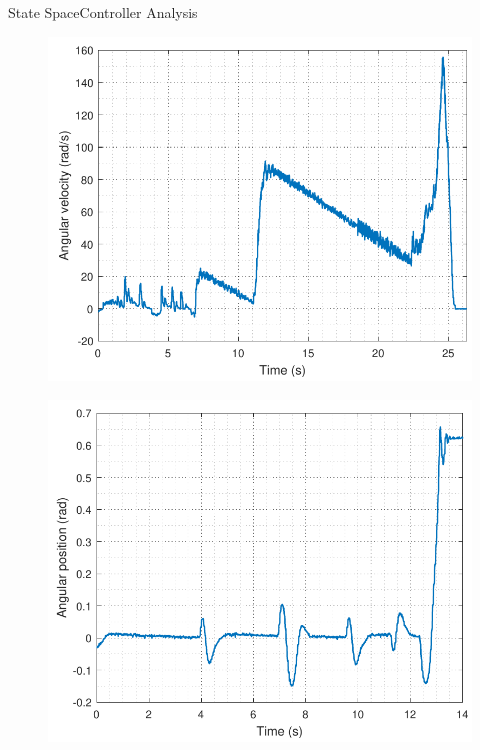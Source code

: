 \begin{frame}{State Space}{Controller Analysis}
\begin{minipage}{\linewidth}
\begin{minipage}{0.45\linewidth}
\begin{figure}[H]
    			\includegraphics[scale=.35]{Pictures/wheelRLTest}
    			\centering
    		\end{figure}
    	\end{minipage}
    \end{minipage}
  \vspace{.5cm}
  \begin{minipage}{\linewidth}
   	\begin{minipage}{0.45\linewidth}
   		\begin{figure}[H]
   			\includegraphics[scale=.35]{Pictures/positionSSTest}
   			\centering
   		\end{figure}

\end{minipage}
\end{minipage}
\end{frame}
